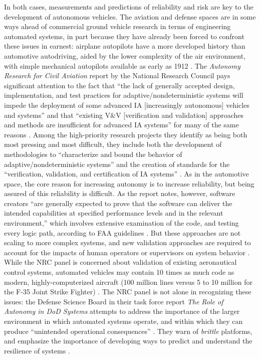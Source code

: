 
In both cases, measurements and predictions of reliability and risk
are key to the development of autonomous vehicles. The aviation and
defense spaces are in some ways ahead of commercial ground vehicle
research in terms of engineering automated systems, in part because
they have already been forced to confront these issues in earnest:
airplane autopilots have a more developed history than automotive
autodriving, aided by the lower complexity of the air environment,
with simple mechanical autopilots available as early as
1912 \cite[p. 16]{NRCAutonomy}. The \emph{Autonomy Research for
  Civil Aviation} report by the National Research Council pays
significant attention to the fact that ``the lack of generally
accepted design, implementation, and test practices for
adaptive/nondeterministic systems will impede the deployment of some
advanced IA [increasingly autonomous] vehicles and systems'' and that
``existing V\&V [verification and
  validation] approaches and methods are insufficient for advanced IA
systems'' for many of the same reasons \cite[p. 2]{NRCAutonomy}.
Among the high-priority research projects they identify as being both
most pressing and most difficult, they include both the development of
methodologies to ``characterize and bound the behavior of
adaptive/nondeterministic systems'' and the creation of standards for
the ``verification, validation, and certification of IA
systems'' \cite[p. 4]{NRCAutonomy}. As in the automotive space, the
core reason for increasing autonomy is to increase reliability, but
being assured of this reliability is difficult. As the report notes,
however, software creators ``are generally expected to prove that the
software can deliver the intended capabilities at specified
performance levels and in the relevant environment,'' which involves
extensive examination of the code, and testing every logic path,
according to FAA guidelines \cite[p. 39--40]{NRCAutonomy}. But
these approaches are not scaling to more complex systems, and new
validation approaches are required to account for the impacts of human
operators or supervisors on system behavior \cite[p.
  40]{NRCAutonomy}. While
the NRC panel is concerned about validation of existing aeronautical
control systems, automated vehicles may contain 10 times as much code
as modern, highly-computerized aircraft (100 million lines versus 5 to
10 million for the F-35 Joint Strike Fighter)
\cite{reutersF35}.
The NRC panel is not alone in recognizing these 
issues: the Defense Science Board in their task force report \emph{The
  Role of Autonomy in DoD Systems} attempts to address the importance
of the larger environment in which automated systems operate, and
within which they can produce ``unintended operational
consequences'' \cite[p. 2]{DSB}. They warn of \emph{brittle}
platforms, and emphasize the importance of developing ways to predict
and understand the resilience of systems \cite[p. 7, 11]{DSB}.

